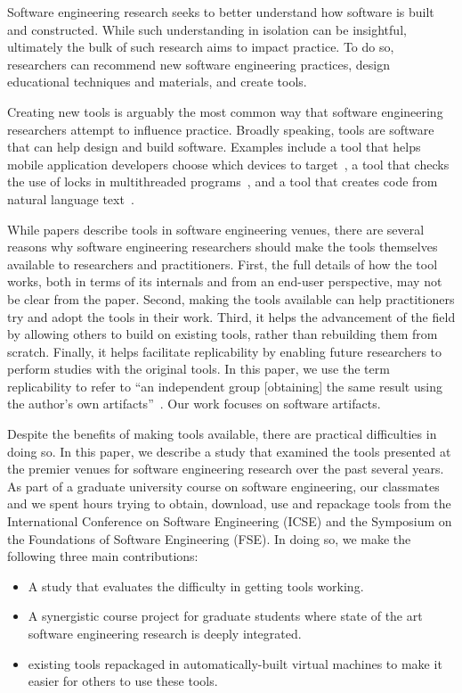 \documentclass[10pt,conference]{IEEEtran}
\begin{document}
Software engineering research seeks to better understand how software is built
and constructed. While such understanding in isolation can be insightful,
ultimately the bulk of such research aims to impact practice. To do so,
researchers can recommend new software engineering practices, design educational
techniques and materials, and create tools.

Creating new tools is arguably the most common way that software engineering
researchers attempt to influence practice. %
Broadly speaking, tools are software that can help design and build software.
Examples include a tool that helps mobile application developers choose which
devices to target~\cite{prada}, a tool that checks the use of locks in
multithreaded programs~\cite{ernst}, and a tool that creates code from natural
language text~\cite{desai}.

While papers describe tools in software engineering venues,
there are several reasons why software engineering researchers 
should make the tools themselves available to researchers and practitioners.
First, the full details of how the tool works, both in terms of its internals
and from an end-user perspective, may not be clear from the paper.
Second, making the tools available can help practitioners try and adopt
the tools in their work.
Third, it helps the advancement of the field by allowing others to build on 
existing tools, rather than rebuilding them from scratch.
Finally, it helps facilitate replicability by enabling future researchers
to perform studies with the original tools.
In this paper, we use the term replicability
to refer to ``an independent group [obtaining] the same result using 
the author's own artifacts''~\cite{acmArtifactPolicy}.
Our work focuses on software artifacts.

Despite the benefits of making tools available, there are practical difficulties in doing so.
In this paper, we describe a study that examined the tools presented at 
the premier venues for software engineering research over the 
past several years.
As part of a graduate university course on software engineering, 
our classmates and we spent \durationTotal hours trying to obtain, download, use
and repackage tools from the International Conference
on Software Engineering (ICSE) and the Symposium on the Foundations
of Software Engineering (FSE).
In doing so, we make the following three main 
contributions:

\begin{itemize}
  \item A study that evaluates the difficulty in getting \totalToolsTried 
  		tools working.
  \item A synergistic course project for graduate students 
		where state of the art software engineering research is deeply integrated.
  \item \permissionToRedistribute existing tools repackaged in automatically-built virtual machines
  		to make it easier for others to use these tools.
\end{itemize}
\end{document}

